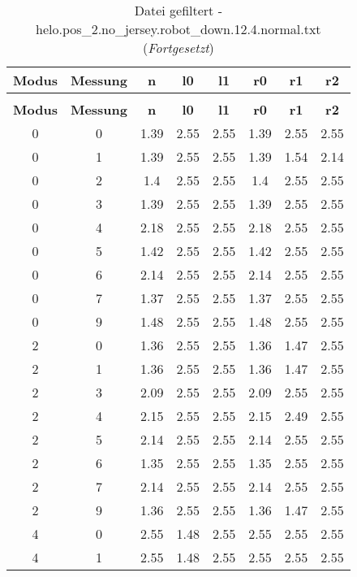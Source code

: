 \clearpage{}
\begin{longtable}{|c|c||c||c|c||c|c|c|}
	\caption{Datei gefiltert - helo.pos\_2.no\_jersey.robot\_down.12.4.normal.txt} \label{tab:helo.pos-2.no-jersey.robot-down.12.4.normal.txt} \\ \hline
	\textbf{Modus} & \textbf{Messung} & \textbf{n} & \textbf{l0} & \textbf{l1} & \textbf{r0} & \textbf{r1} & \textbf{r2}\\ \hline
	\endfirsthead
	\caption[]{Datei gefiltert - helo.pos\_2.no\_jersey.robot\_down.12.4.normal.txt (\emph{Fortgesetzt})} \\ \hline
	\textbf{Modus} & \textbf{Messung} & \textbf{n} & \textbf{l0} & \textbf{l1} & \textbf{r0} & \textbf{r1} & \textbf{r2}\\ \hline
	\endhead
	0 & 0 & 1.39 & 2.55 & 2.55 & 1.39 & 2.55 & 2.55 \\ \hline
	0 & 1 & 1.39 & 2.55 & 2.55 & 1.39 & 1.54 & 2.14 \\ \hline
	0 & 2 & 1.4 & 2.55 & 2.55 & 1.4 & 2.55 & 2.55 \\ \hline
	0 & 3 & 1.39 & 2.55 & 2.55 & 1.39 & 2.55 & 2.55 \\ \hline
	0 & 4 & 2.18 & 2.55 & 2.55 & 2.18 & 2.55 & 2.55 \\ \hline
	0 & 5 & 1.42 & 2.55 & 2.55 & 1.42 & 2.55 & 2.55 \\ \hline
	0 & 6 & 2.14 & 2.55 & 2.55 & 2.14 & 2.55 & 2.55 \\ \hline
	0 & 7 & 1.37 & 2.55 & 2.55 & 1.37 & 2.55 & 2.55 \\ \hline
	0 & 9 & 1.48 & 2.55 & 2.55 & 1.48 & 2.55 & 2.55 \\ \hline
	2 & 0 & 1.36 & 2.55 & 2.55 & 1.36 & 1.47 & 2.55 \\ \hline
	2 & 1 & 1.36 & 2.55 & 2.55 & 1.36 & 1.47 & 2.55 \\ \hline
	2 & 3 & 2.09 & 2.55 & 2.55 & 2.09 & 2.55 & 2.55 \\ \hline
	2 & 4 & 2.15 & 2.55 & 2.55 & 2.15 & 2.49 & 2.55 \\ \hline
	2 & 5 & 2.14 & 2.55 & 2.55 & 2.14 & 2.55 & 2.55 \\ \hline
	2 & 6 & 1.35 & 2.55 & 2.55 & 1.35 & 2.55 & 2.55 \\ \hline
	2 & 7 & 2.14 & 2.55 & 2.55 & 2.14 & 2.55 & 2.55 \\ \hline
	2 & 9 & 1.36 & 2.55 & 2.55 & 1.36 & 1.47 & 2.55 \\ \hline
	4 & 0 & 2.55 & 1.48 & 2.55 & 2.55 & 2.55 & 2.55 \\ \hline
	4 & 1 & 2.55 & 1.48 & 2.55 & 2.55 & 2.55 & 2.55 \\ \hline

\end{longtable}

